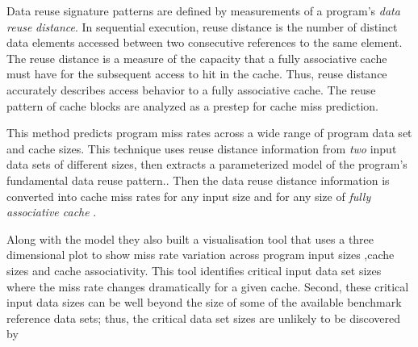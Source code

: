 \documentclass[12pt]{article}
\begin{document}
\vspace{\baselineskip}
\begin{adjustwidth}{0.0in}{0.03in}
{\fontsize{10pt}{12.0pt}\selectfont \textcolor[HTML]{333333}{Data reuse signature patterns are defined by measurements of a program's \textit{data reuse} \textit{distance}. In sequential execution, reuse distance is the number of distinct data elements accessed\textit{ }between two consecutive references to the same element. The reuse distance is a measure of the capacity that a fully associative cache must have for the subsequent access to hit in the cache. Thus, reuse distance accurately describes access behavior to a fully associative cache. The reuse pattern of cache blocks are analyzed as a prestep for cache miss prediction.}\par}\par

\end{adjustwidth}


\vspace{\baselineskip}
\begin{adjustwidth}{0.0in}{0.06in}
{\fontsize{11pt}{13.2pt}\selectfont \textcolor[HTML]{333333}{This method predicts program miss rates across a wide range of program data set and cache sizes. This technique uses reuse distance information from \textit{two} input data sets of different sizes, then extracts a parameterized model of the program's fundamental data reuse pattern.. Then the data reuse distance information is converted into cache miss rates for any input size and for any size of \textit{fully} \textit{associative cache }.}\par}\par

\end{adjustwidth}


\vspace{\baselineskip}
\begin{adjustwidth}{0.0in}{0.07in}
{\fontsize{10pt}{12.0pt}\selectfont \textcolor[HTML]{333333}{Along with the model they also built a visualisation tool that uses a three dimensional plot to show miss rate variation across program input sizes ,cache sizes and cache associativity. This tool identifies critical input data set sizes where the miss rate changes dramatically for a given cache. Second, these critical input data sizes can be well beyond the size of some of the available benchmark reference data sets; thus, the critical data set sizes are unlikely to be discovered by}\par}\par

\end{adjustwidth}
\end{document}
